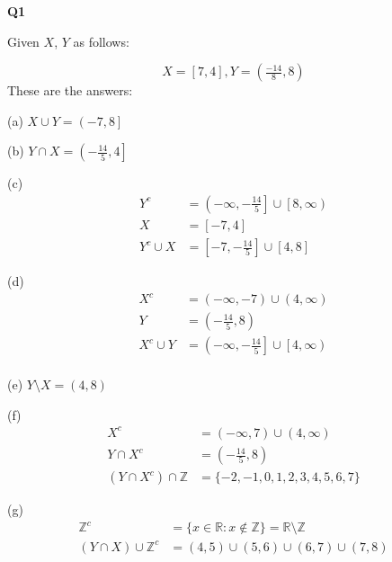 \documentclass[12pt, a4paper]{article}
\newcommand{\R}{\mathbb{R}}
\newcommand{\Z}{\mathbb{Z}}
\newcommand{\open}[1]{\left(#1\right)}
\newcommand{\closed}[1]{\left[#1\right]}
\newcommand{\openclosed}[1]{\left(#1\right]}
\newcommand{\closedopen}[1]{\left[#1\right)}
\begin{document}
\begin{flushleft}

\textbf{Q1}

Given $X$, $Y$ as follows:

\[ 
    X = \closed{7, 4}, Y = \open{\tfrac{-14}{8},8}
\]
These are the answers:

(a) $X \cup Y = \openclosed{-7, 8}$

(b) $Y \cap X = \openclosed{-\frac{14}{5}, 4}$

(c) 
\begin{align*}
    Y^{c} & = \openclosed{-\infty, -\tfrac{14}{5}} \cup \closedopen{8, \infty}\\
    X & = \closed{-7, 4}\\
    Y^{c} \cup X & = \closed{-7,-\tfrac{14}{5}} \cup \closed{4,8}
\end{align*}

(d)
\begin{align*}
    X^{c} & = \open{-\infty,-7} \cup \open{4,\infty}\\
    Y & = \open{-\tfrac{14}{5},8}\\
    X^{c} \cup Y & = \openclosed{-\infty,-\tfrac{14}{5}} \cup \closedopen{4,\infty}\\
\end{align*}

(e) $Y \setminus X = \open{4,8}$

(f)
\begin{align*}
    X^{c} & = \open{-\infty,7} \cup \open{4,\infty}\\
    Y \cap X^{c} & = \open{-\tfrac{14}{5},8}\\
    \left(Y \cap X^{c}\right) \cap \Z & = \{-2,-1,0,1,2,3,4,5,6,7\}
\end{align*}

(g)
\begin{align*}
    \Z^{c} & = \{ x \in \R : x \notin \Z \} = \R \setminus \Z\\
    \open{Y \cap X} \cup \Z^{c} & = 
        \open{4,5} \cup 
        \open{5,6} \cup 
        \open{6,7} \cup
        \open{7,8}
\end{align*}

\end{flushleft}
\end{document}
